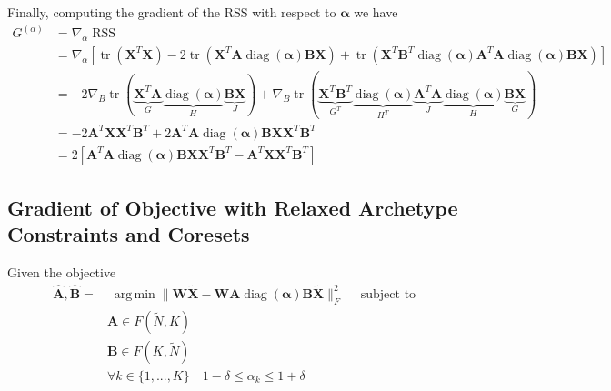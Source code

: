 \documentclass{article}
\DeclareMathOperator*{\argmin}{arg\,min}
\begin{document}
Finally, computing the gradient of the RSS with respect to $\boldsymbol{\alpha}$ we have
\begin{equation}
    \label{eq:relaxed_objective_grad_alpha}
    \begin{aligned}
        G^{(\alpha)} &= \nabla_{\alpha} \operatorname{RSS} \\
        &= \nabla_{\alpha}
        \left[
            \operatorname{tr}\left( \mathbf{X}^T \mathbf{X} \right)
            - 2 \operatorname{tr} \left( \mathbf{{X}}^T \mathbf{{A}} \operatorname{diag}(\boldsymbol{\alpha}) \mathbf{B} \mathbf{X} \right)
            + \operatorname{tr} \left( \mathbf{X}^T \mathbf{B}^T \operatorname{diag}(\boldsymbol{\alpha}) \mathbf{{A}}^T \mathbf{{A}} \operatorname{diag}(\boldsymbol{\alpha}) \mathbf{B} \mathbf{X} \right)
        \right] \\
        &=
            - 2 \nabla_B \operatorname{tr}(\underbrace{\mathbf{{X}}^T \mathbf{{A}}}_{G} \underbrace{\operatorname{diag}(\boldsymbol{\alpha})}_{H} \underbrace{\mathbf{B} \mathbf{X}}_{J})
            + \nabla_B \operatorname{tr}(\underbrace{\mathbf{X}^T \mathbf{B}^T }_{G^T} \underbrace{\operatorname{diag}(\boldsymbol{\alpha})}_{H^T} \underbrace{\mathbf{{A}}^T \mathbf{{A}}}_{J} \underbrace{\operatorname{diag}(\boldsymbol{\alpha})}_{H} \underbrace{\mathbf{B} \mathbf{X}}_{G}) \\
        & =
            -2 \mathbf{{A}}^T \mathbf{{X}} \mathbf{X}^T \mathbf{B}^T
            +2 \mathbf{{A}}^T \mathbf{{A}} \operatorname{diag}(\boldsymbol{\alpha}) \mathbf{B} \mathbf{X} \mathbf{X}^T \mathbf{B}^T  \\
        & = 2
        \left[
            \mathbf{{A}}^T \mathbf{{A}} \operatorname{diag}(\boldsymbol{\alpha}) \mathbf{B} \mathbf{X} \mathbf{X}^T \mathbf{B}^T
            - \mathbf{{A}}^T \mathbf{{X}} \mathbf{X}^T \mathbf{B}^T
        \right]
    \end{aligned}
\end{equation}

\subsection{Gradient of Objective with Relaxed Archetype Constraints and Coresets}
\label{subsec:relaxed_weighted_objective_grad}

Given the objective
\begin{equation}
\label{eq:relaxed_weighted_objective_}
    \begin{aligned}
        \hat{\mathbf{A}}, \hat{\mathbf{B}} =& \; \underset{}{\argmin}
        \| \mathbf{W} \tilde{\mathbf{X}} -  \mathbf{W} {\mathbf{A}} \operatorname{diag}(\boldsymbol{\alpha}) \mathbf{B} \tilde{\mathbf{X}} \|_F^2 \quad \text{ subject to } \\
        & \mathbf{A} \in F(\tilde{N}, K) \\
        & \mathbf{B} \in F(K, \tilde{N}) \\
        & \forall k \in \{1, ..., K\} \quad 1 - \delta \leq \alpha_k \leq 1 + \delta
    \end{aligned}
\end{equation}
\end{document}
